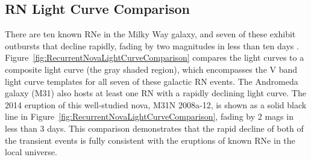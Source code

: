 \subsection{RN Light Curve Comparison}\label{sec:RNLightCurves}


There are ten known RNe in the Milky Way galaxy, and seven of
these exhibit outbursts that decline rapidly, fading by two magnitudes
in less than ten days \citep{Schaefer:2010}. 
Figure~\ref{fig:RecurrentNovaLightCurveComparison} compares the \spock
light curves to a composite light curve (the gray shaded region),
which encompasses the V band light curve templates
\citep{Schaefer:2010} for all seven of these galactic RN events.  The
Andromeda galaxy (M31) also hosts at least one RN with a rapidly
declining light curve.  The 2014 eruption of this well-studied nova,
M31N 2008a-12, is shown as a solid black line in
Figure~\ref{fig:RecurrentNovaLightCurveComparison}, fading by 2 mags
in less than 3 days.  This comparison demonstrates that the rapid
decline of both of the \spock transient events is fully consistent
with the eruptions of known RNe in the local universe.



